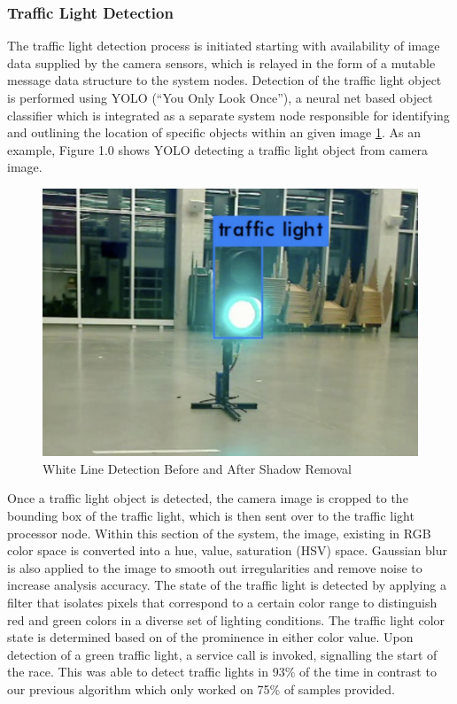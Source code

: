 \documentclass[11pt,journal]{IEEEtran}
\begin{document}
\subsubsection{Traffic Light Detection}
The traffic light detection process is initiated starting with availability of image data supplied by the camera sensors, which is relayed in the form of a mutable message data structure to the system nodes. Detection of the traffic light object is performed using YOLO (“You Only Look Once”)\cite{TrafLight}, a neural net based object classifier which is integrated as a separate system node responsible for identifying and outlining the location of specific objects within an given image \ref{TrafficLight}. As an example, Figure 1.0 shows YOLO detecting a traffic light object from camera image.
\begin{figure}[ht]
\centerline{\includegraphics[width=0.9\columnwidth]{traffic_green.png}}
\caption{White Line Detection Before and After Shadow Removal}
\label{TrafficLight}
\end{figure}

Once a traffic light object is detected, the camera image is cropped to the bounding box of the traffic light, which is then sent over to the traffic light processor node. Within this section of the system, the image, existing in RGB color space is converted into a hue, value, saturation (HSV) space. Gaussian blur is also applied to the image to smooth out irregularities and remove noise to increase analysis accuracy. The state of the traffic light is detected by applying a filter that isolates pixels that correspond to a certain color range to distinguish red and green colors in a diverse set of lighting conditions. The traffic light color state is determined based on of the prominence in either color value. Upon detection of a green traffic light, a service call is invoked, signalling the start of the race. This was able to detect traffic lights in 93\% of the time in contrast to our previous algorithm which only worked on 75\% of samples provided.
\end{document}
